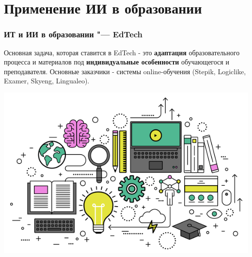 \documentclass[default]{beamer}
\begin{document}
	\section{Применение ИИ в образовании}
	
	\begin{frame}
		\frametitle{ИТ и ИИ в образовании "--- EdTech}
		
		Основная задача, которая ставится в EdTech - это \textbf{адаптация} образовательного процесса и материалов под \textbf{индивидуальные особенности} обучающегося и преподавателя. Основные заказчики - системы online-обучения (Stepik, Logiclike, Examer, Skyeng, Lingualeo).

		\centering
		\includegraphics[width=\textheight]{edtech.png}
		
	\end{frame}
	
\end{document}
